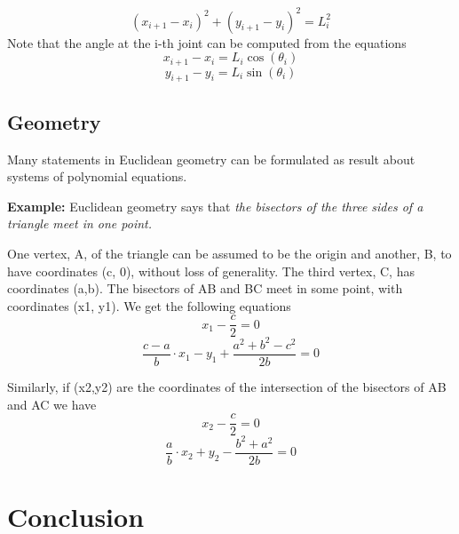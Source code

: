 \documentclass[11pt]{article}
\begin{document}
 \begin{equation}
    (x_{i+1}-x_i)^2 + (y_{i+1}-y_i)^2=L_i^2
\end{equation}
Note that the angle at the i-th joint can be computed from the equations
 \begin{equation}
    x_{i+1}-x_i = L_i \cos(\theta_i)
\end{equation}
 \begin{equation}
    y_{i+1}-y_i = L_i \sin(\theta_i)
\end{equation}

\subsection{Geometry}
Many statements in Euclidean geometry can be formulated as result about systems of polynomial equations.\cite{richterArticle}

\textbf {Example:} Euclidean geometry says that \textit{the bisectors of the three sides of a triangle meet in one point.}

One vertex, A, of the triangle can be assumed to be the origin and another, B, to have coordinates (c, 0), without loss of generality. The third vertex, C, has coordinates (a,b).
The bisectors of AB and BC meet in some point, with coordinates (x1, y1). We get the following equations
\begin{equation}
    x_1- \frac {c}{2}=0
\end{equation}
\begin{equation}
    \frac {c-a}{b} \cdotp x_1 - y_1 + \frac {a^2 + b^2 - c^2}{2b} = 0
\end{equation}

Similarly, if (x2,y2) are the coordinates of the intersection of the bisectors of AB and AC we have
\begin{equation}
    x_2- \frac {c}{2}=0
\end{equation}
\begin{equation}
    \frac {a}{b} \cdotp x_2 + y_2 - \frac {b^2 + a^2}{2b} = 0
\end{equation}

\section{Conclusion}
\end{document}
